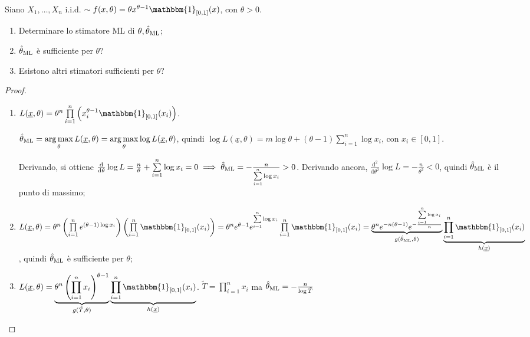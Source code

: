 \documentclass[hidelinks, 10pt]{report}
\DeclareMathOperator{\argmax}{\arg\max}
\begin{document}
\begin{ex}
Siano $ X_1, \dotsc, X_n $ i.i.d. $ \sim f(x, \theta) = \theta x^{\theta - 1} \mathbbm{1}_{[0, 1]} (x) $, con $ \theta > 0 $.
\begin{enumerate}
\item Determinare lo stimatore ML di $ \theta, \hat{\theta}_{\text{ML}} $;
\item $ \hat{\theta}_{\text{ML}} $ \`e sufficiente per $ \theta $?
\item Esistono altri stimatori sufficienti per $ \theta $?
\end{enumerate}
\end{ex}
\begin{proof}
\noindent
\begin{enumerate}
\item $ L(\underline{x}, \theta) = \theta^{n} \prod\limits_{i = 1}^{n} \left( x_i^{\theta - 1} \mathbbm{1}_{[0,1]} (x_i) \right) $.

$ \ML{\theta} = \argmax\limits_{\theta} L(\underline{x}, \theta) = \argmax\limits_{\theta} \log L(\underline{x}, \theta) $, quindi $ \log L(\underline{x}, \theta) = m \log \theta + (\theta - 1) \sum\limits_{i = 1}^{n} \log x_i $, con $ x_i \in [0,1] $.

Derivando, si ottiene $ \frac{\mathrm{d}}{\mathrm{d}\theta} \log L = \frac{n}{\theta} + \sum\limits_{i = 1}^{n} \log x_i = 0 \implies \hat{\theta}_{\text{ML}} = - \frac{n}{\sum\limits_{i = 1}^{n} \log x_i} > 0 $. Derivando ancora, $ \frac{\mathrm{d^2}}{\mathrm{d}\theta^2} \log L = - \frac{n}{\theta^2} < 0 $, quindi $ \hat{\theta}_{\text{ML}} $ \`e il punto di massimo;
\item $ L(\underline{x}, \theta) = \theta^n \left( \prod\limits_{i = 1}^{n} e^{(\theta - 1) \log x_i} \right) \left( \prod\limits_{i = 1}^{n} \mathbbm{1}_{[0, 1]} (x_i) \right) = \theta^{n} e^{\theta - 1} e^{\sum\limits_{i = 1}^{n} \log x_i} \prod\limits_{i = 1}^{n} \mathbbm{1}_{[0,1]} (x_i) = \underbrace{\theta^{n} e^{-n(\theta - 1)} e^{-\frac{\sum\limits_{i = 1}^{n} \log x_i}{n}}}_{g(\ML{\theta}, \theta)} \underbrace{\prod\limits_{i = 1}^{n} \mathbbm{1}_{[0,1]} (x_i)}_{h(\underline{x})} $, quindi $ \hat{\theta}_{\text{ML}} $ \`e sufficiente per $ \theta $;
\item $ L(\underline{x}, \theta) = \underbrace{\theta^{n} \left( \prod\limits_{i = 1}^{n} x_i \right)^{\theta - 1}}_{g(\tilde{T}, \theta)} \underbrace{\prod\limits_{i = 1}^{n} \mathbbm{1}_{[0,1]} (x_i)}_{h(\underline{x})} $. $ \tilde{T} = \prod\limits_{i = 1}^{n} x_i $ ma $ \hat{\theta}_{\text{ML}} = - \frac{n}{\log \tilde{T}} $ %
\end{enumerate}
\end{proof}
\end{document}
